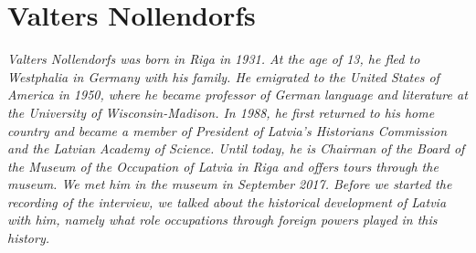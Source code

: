 \section{Valters Nollendorfs}

\textit{Valters Nollendorfs was born in Riga in 1931. At the age of 13, he fled to Westphalia in Germany with his family. He emigrated to the United States of America in 1950, where he became professor of German language and literature at the University of Wisconsin-Madison. In 1988, he first returned to his home country and became a member of President of Latvia's Historians Commission and the Latvian Academy of Science. Until today, he is Chairman of the Board of the Museum of the Occupation of Latvia in Riga and offers tours through the museum. We met him in the museum in September 2017. Before we started the recording of the interview, we talked about the historical development of Latvia with him, namely what role occupations through foreign powers played in this history.}\par
\vspace*{2em}
